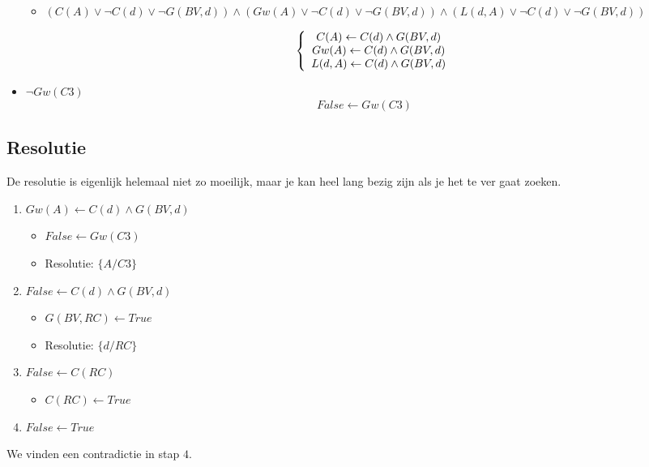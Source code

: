 \documentclass[alternative-exam.tex]{subfiles}
\begin{document}
\begin{itemize}
\begin{itemize}
\item 
$(C(A)\vee \neg C(d) \vee \neg G(BV,d)) \wedge (Gw(A)\vee  \neg C(d) \vee \neg G(BV,d)) \wedge (L(d,A) \vee \neg C(d) \vee \neg G(BV,d))$

\[
\left\{
\begin{array}{c c c}
C(A)\leftarrow  C(d) \wedge  G(BV,d)\\
Gw(A) \leftarrow  C(d) \wedge  G(BV,d)\\
L(d,A) \leftarrow C(d) \wedge G(BV,d)\\
\end{array}
\right.
\]
\end{itemize}

\item $\neg Gw(C3)$
\[
False \leftarrow Gw(C3)
\]
\end{itemize}

\subsection{Resolutie}
De resolutie is eigenlijk helemaal niet zo moeilijk, maar je kan heel lang bezig zijn als je het te ver gaat zoeken.

\begin{enumerate}

\item $Gw(A) \leftarrow C(d) \wedge G(BV,d)$
\begin{itemize}
\item $False \leftarrow Gw(C3)$
\item Resolutie: $\{ A/C3\}$
\end{itemize}

\item $False \leftarrow C(d) \wedge G(BV,d)$
\begin{itemize}
\item $G(BV,RC) \leftarrow True$
\item Resolutie: $\{ d/RC\}$
\end{itemize}

\item $False \leftarrow C(RC)$
\begin{itemize}
\item $C(RC) \leftarrow True$
\end{itemize}

\item $False \leftarrow True$
\end{enumerate}
We vinden een contradictie in stap $4$.
\end{document}
